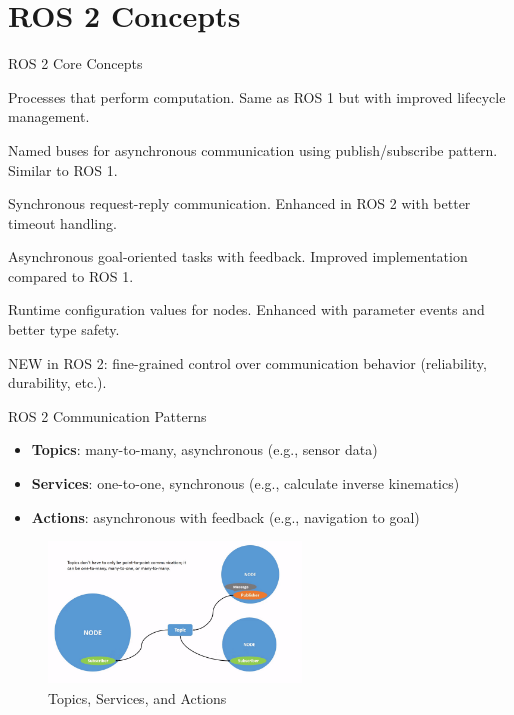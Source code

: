 \section{ROS 2 Concepts}

\begin{frame}[allowframebreaks]{ROS 2 Core Concepts}
    \begin{description}[leftmargin=3cm]
        \item[Nodes] Processes that perform computation. Same as ROS 1 but with improved lifecycle management.

        \item[Topics] Named buses for asynchronous communication using publish/subscribe pattern. Similar to ROS 1.

        \item[Services] Synchronous request-reply communication. Enhanced in ROS 2 with better timeout handling.

        \item[Actions] Asynchronous goal-oriented tasks with feedback. Improved implementation compared to ROS 1.

        \item[Parameters] Runtime configuration values for nodes. Enhanced with parameter events and better type safety.

        \item[Quality of Service (QoS)] NEW in ROS 2: fine-grained control over communication behavior (reliability, durability, etc.).
    \end{description}
\end{frame}

\begin{frame}{ROS 2 Communication Patterns}
    \begin{itemize}
        \item \textbf{Topics}: many-to-many, asynchronous (e.g., sensor data)
        \item \textbf{Services}: one-to-one, synchronous (e.g., calculate inverse kinematics)
        \item \textbf{Actions}: asynchronous with feedback (e.g., navigation to goal)
    \end{itemize}
    \begin{figure}
        \centering
        \includegraphics[width=0.6\textwidth]{img/ros2/ros2_communication.png}
        \caption{Topics, Services, and Actions}
    \end{figure}

\end{frame}



